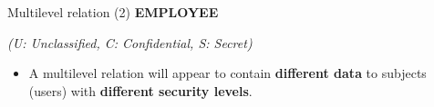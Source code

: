 \begin{frame}{Multilevel relation (2)}
    \Large
    \textbf{EMPLOYEE}
    \vspace{0.05cm}
    
    \begin{center}
    \end{center}
    \small \textit{(U: Unclassified, C: Confidential, S: Secret)}
    
    \vspace{0.25cm}
    \begin{itemize}
      \large  \item A multilevel relation will appear to contain \textbf{different data} to subjects (users) with \textbf{different security levels}.
    \end{itemize}
\end{frame}


